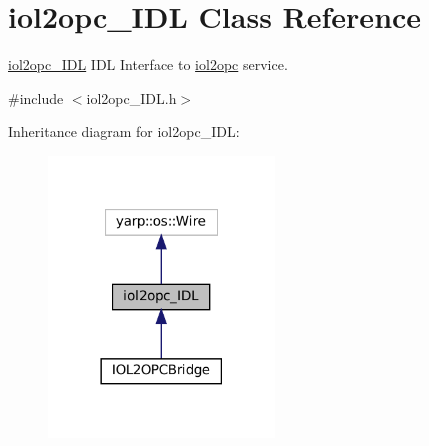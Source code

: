 \hypertarget{classiol2opc__IDL}{}\section{iol2opc\+\_\+\+I\+DL Class Reference}
\label{classiol2opc__IDL}


\hyperlink{classiol2opc__IDL}{iol2opc\+\_\+\+I\+DL} I\+DL Interface to \hyperlink{group__iol2opc}{iol2opc} service.  




{\ttfamily \#include $<$iol2opc\+\_\+\+I\+D\+L.\+h$>$}



Inheritance diagram for iol2opc\+\_\+\+I\+DL\+:
\nopagebreak
\begin{figure}[H]
\begin{center}
\leavevmode
\includegraphics[width=170pt]{classiol2opc__IDL__inherit__graph}
\end{center}
\end{figure}
